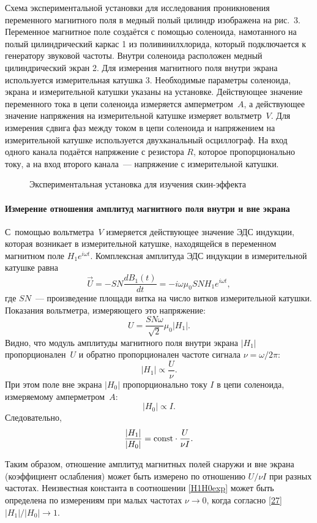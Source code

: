 \experiment
Схема экспериментальной установки для исследования проникновения переменного магнитного поля в медный полый цилиндр
изображена на рис.~3. Переменное магнитное поле создаётся с помощью соленоида, намотанного на полый цилиндрический каркас 1
из поливинилхлорида, который подключается к генератору звуковой частоты. Внутри соленоида расположен медный цилиндрический
экран 2. Для измерения магнитного поля внутри экрана используется измерительная катушка 3. Необходимые параметры
соленоида, экрана и измерительной катушки указаны на установке. Действующее значение переменного тока в цепи соленоида
измеряется амперметром~$A$, а действующее значение напряжения
на измерительной катушке измеряет вольтметр~$V$. Для измерения сдвига фаз между током в цепи соленоида и напряжением на измерительной катушке
используется двухканальный осциллограф. На вход одного канала подаётся напряжение с резистора $R$, которое
пропорционально току, а на вход второго канала~--- напряжение с измерительной катушки.

\begin{figure}[h!]
    \centering
    \caption{Экспериментальная установка для изучения скин-эффекта}
\end{figure}
\paragraph{Измерение отношения амплитуд магнитного поля внутри и вне экрана}

С~помощью вольтметра~$V$ измеряется действующее значение ЭДС индукции,
которая возникает в измерительной катушке, находящейся в переменном магнитном поле
$H_1e^{i\omega t}$.
Комплексная амплитуда ЭДС индукции в измерительной катушке равна
\[
\vec{U}=-SN\frac{dB_{1}(t)}{dt}=-i\omega \mu_0 S N H_1 e^{i\omega t},
\]
где $SN$~--- произведение площади витка на число витков измерительной катушки.
Показания вольтметра, измеряющего это напряжение:
\[
U= \frac{SN\omega}{\sqrt{2}}\mu_0|H_1|.
\]
Видно, что модуль амплитуды магнитного поля внутри экрана $|H_1|$ 
пропорционален~$U$ и обратно пропорционален частоте сигнала $\nu = \omega / 2\pi$:
\[
|H_1|\propto \frac{U}{\nu}.
\]
При этом поле вне экрана $|H_0|$ пропорционально току $I$ в цепи соленоида,
измеряемому амперметром~$A$:
\[
|H_0| \propto I.
\]
Следовательно,
\begin{equation} \eqmark{H1H0exp}
\frac{|H_1|}{|H_0|} = \const \cdot \frac{U}{\nu I}.
\end{equation}

Таким образом, отношение амплитуд магнитных полей снаружи и вне экрана
(коэффициент ослабления) может быть измерено
по отношению $U/\nu I$ при разных частотах. Неизвестная константа
в соотношении \eqref{H1H0exp} может быть определена по измерениям
при малых частотах $\nu \to 0$, когда согласно \eqref{27} $|H_1|/|H_0| \to 1$.

